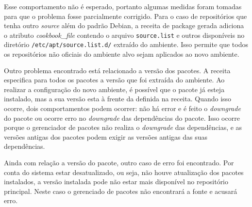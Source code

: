 Esse comportamento não é esperado, portanto algumas medidas foram tomadas para
que o problema fosse parcialmente corrigido. Para o caso de repositórios que
tenha outro \textit{source} além do padrão Debian, a receita de package gerada adiciona
o atributo \textit{cookbook\_file} contendo o arquivo \texttt{source.list} e outros disponíveis
no diretório \texttt{/etc/apt/source.list.d/} extraído do ambiente. Isso permite
que todos os repositórios não oficiais do ambiente alvo sejam aplicados ao novo ambiente.

%
%  

Outro problema encontrado está relacionado a versão dos pacotes.
A receita especifica para todos os pacotes a versão que foi extraída do ambiente.
Ao realizar a configuração do novo ambiente, é possível que o pacote já esteja instalado,
mas a sua versão esta à frente da definida na receita. Quando isso ocorre, dois comportamentos
podem ocorrer: não há error e é feito o \textit{downgrade} do pacote ou ocorre erro no \textit{downgrade} das
dependências do pacote. Isso ocorre porque o gerenciador de pacotes não realiza o \textit{downgrade}
das dependências, e as versões antigas dos pacotes podem exigir as versões antigas das suas
dependências.

%
%  

Ainda com relação a versão do pacote, outro caso de erro foi encontrado.
Por conta do sistema estar desatualizado, ou seja, não houve atualização dos pacotes
instalados, a versão instalada pode não estar mais disponível no repositório principal.
Neste caso o gerenciado de pacotes não encontrará a fonte e acusará erro.

